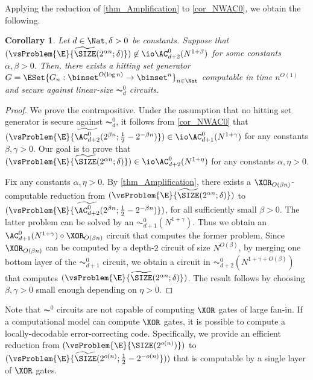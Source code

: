 \documentclass[11pt]{article}
\numberwithin{equation}{section}
\newtheorem{corollary}[theorem]{Corollary}
\theoremstyle{definition}
\theoremstyle{plain}
\begin{document}
Applying the reduction of \cref{thm_Amplification} to \cref{cor_NWAC0},
we obtain the following.
\begin{corollary}
  Let $d \in \Nat, \delta > 0$ be constants.
  Suppose that
  $(\vsProblem{\E}{\widetilde{\SIZE} (2^{\alpha n} ; \delta)} ) \not\in \io \AC^0_{d+2} (N^{1 + \beta})$
  for some constants $\alpha, \beta > 0$.
  Then,
  there exists a hitting set generator $G = \ESet{ G_n : \binset^{O(\log n)} \to \binset^n }_{n \in \Nat} $ computable in time $n^{O(1)}$ and secure against linear-size $\AC^0_{d}$ circuits.
\end{corollary}
\begin{proof}
  We prove the contrapositive.
  Under the assumption that no hitting set generator is secure against $\AC^0_d$,
  it follows from \cref{cor_NWAC0}
  that
  $(\vsProblem{\E}{\widetilde{\AC^{0}_{d+2}} (2^{\beta n} ; \frac{1}{2} - 2^{- \beta n})}) \in \io \AC^0_{d+1} (N^{1 + \gamma})$
  for any constants $\beta, \gamma > 0$.
  Our goal is to prove that
  $(\vsProblem{\E}{\widetilde{\SIZE} (2^{\alpha n} ; \delta)}) \in \io \AC^0_{d+2} (N^{1 + \eta})$
  for any constants $\alpha, \eta > 0$.

  Fix any constants $\alpha, \eta > 0$.
  By \cref{thm_Amplification},
  there exists a $\XOR_{O(\beta n)}$-computable reduction from
  $(\vsProblem{\E}{\widetilde{\SIZE} (2^{\alpha n} ; \delta)})$
  to
  $(\vsProblem{\E}{\widetilde{\AC^{0}_{d+2}} (2^{\beta n} ; \frac{1}{2} - 2^{- \beta n})})$,
  for all sufficiently small $\beta > 0$.
  The latter problem can be solved by an $\AC^0_{d+1}(N^{1 + \gamma})$.
  Thus we obtain an $\AC^0_{d + 1}(N^{1 + \gamma}) \circ \XOR_{O(\beta n)}$ circuit that computes the former problem.
  Since $\XOR_{O(\beta n)}$ can be computed by a depth-$2$ circuit of size $N^{O(\beta)}$,
  by merging one bottom layer of the $\AC^0_{d+1}$ circuit,
  we obtain a circuit in $\AC^0_{d+2} (N^{1 + \gamma + O(\beta)})$ that computes
  $(\vsProblem{\E}{\widetilde{\SIZE} (2^{\alpha n} ; \delta)})$.
  The result follows by choosing $\beta, \gamma > 0$ small enough depending on $\eta > 0$.
\end{proof}

Note that $\AC^0$ circuits are not capable of computing $\XOR$ gates of large fan-in.
If a computational model can compute $\XOR$ gates,
it is possible to compute a locally-decodable error-correcting code.
Specifically, we provide an efficient reduction
from
$(\vsProblem{\E}{{\SIZE}(2^{o( n )})})$
to
$(\vsProblem{\E}{\widetilde{\SIZE}(2^{o( n )}; \frac{1}{2} - 2^{-o( n )}}))$
that is computable by a single layer of $\XOR$ gates.
\end{document}
